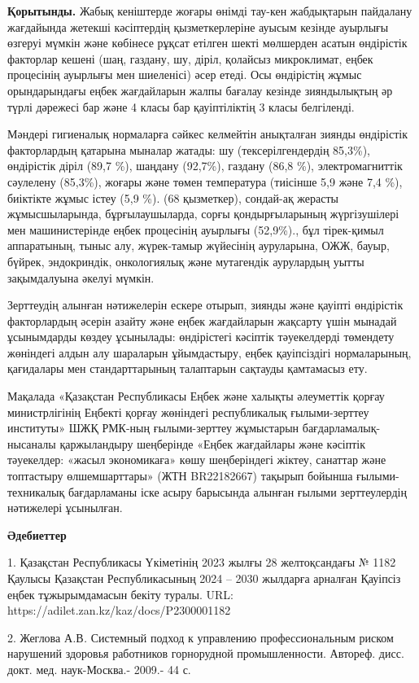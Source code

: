 {\bfseries Қорытынды.} Жабық кеніштерде жоғары өнімді тау-кен жабдықтарын
пайдалану жағдайында жетекші кәсіптердің қызметкерлеріне ауысым кезінде
ауырлығы өзгеруі мүмкін және көбінесе рұқсат етілген шекті мөлшерден
асатын өндірістік факторлар кешені (шаң, газдану, шу, діріл, қолайсыз
микроклимат, еңбек процесінің ауырлығы мен шиеленісі) әсер етеді. Осы
өндірістің жұмыс орындарындағы еңбек жағдайларын жалпы бағалау кезінде
зияндылықтың әр түрлі дәрежесі бар және 4 класы бар қауіптіліктің 3
класы белгіленді.

Мәндері гигиеналық нормаларға сәйкес келмейтін анықталған зиянды
өндірістік факторлардың қатарына мыналар жатады: шу (тексерілгендердің
85,3\%), өндірістік діріл (89,7 \%), шаңдану (92,7\%), газдану (86,8
\%), электромагниттік сәулелену (85,3\%), жоғары және төмен температура
(тиісінше 5,9 және 7,4 \%), биіктікте жұмыс істеу (5,9 \%). (68
қызметкер), сондай-ақ жерасты жұмысшыларында, бұрғылаушыларда, сорғы
қондырғыларының жүргізушілері мен машинистерінде еңбек процесінің
ауырлығы (52,9\%)., бұл тірек-қимыл аппаратының, тыныс алу, жүрек-тамыр
жүйесінің ауруларына, ОЖЖ, бауыр, бүйрек, эндокриндік, онкологиялық және
мутагендік аурулардың уытты зақымдалуына әкелуі мүмкін.

Зерттеудің алынған нәтижелерін ескере отырып, зиянды және қауіпті
өндірістік факторлардың әсерін азайту және еңбек жағдайларын жақсарту
үшін мынадай ұсынымдарды көздеу ұсынылады: өндірістегі кәсіптік
тәуекелдерді төмендету жөніндегі алдын алу шараларын ұйымдастыру, еңбек
қауіпсіздігі нормаларының, қағидалары мен стандарттарының талаптарын
сақтауды қамтамасыз ету.

Мақалада «Қазақстан Республикасы Еңбек және халықты әлеуметтік қорғау
министрлігінің Еңбекті қорғау жөніндегі республикалық ғылыми-зерттеу
институты» ШЖҚ РМК-ның ғылыми-зерттеу жұмыстарын бағдарламалық-нысаналы
қаржыландыру шеңберінде «Еңбек жағдайлары және кәсіптік тәуекелдер:
«жасыл экономикаға» көшу шеңберіндегі жіктеу, санаттар және топтастыру
өлшемшарттары» (ЖТН BR22182667) тақырып бойынша ғылыми-техникалық
бағдарламаны іске асыру барысында алынған ғылыми зерттеулердің
нәтижелері ұсынылған.

{\bfseries Әдебиеттер}

1. Қазақстан Республикасы Үкіметінің 2023 жылғы 28 желтоқсандағы № 1182
Қаулысы Қазақстан Республикасының 2024 -- 2030 жылдарға арналған
Қауіпсіз еңбек тұжырымдамасын бекіту туралы. URL:
https://adilet.zan.kz/kaz/docs/P2300001182

2. Жеглова А\emph{.}В\emph{.} Системный подход к управлению
профессиональным риском нарушений здоровья работников горнорудной
промышленности. Автореф. дисс. докт. мед. наук-Москва.- 2009.- 44 с.


